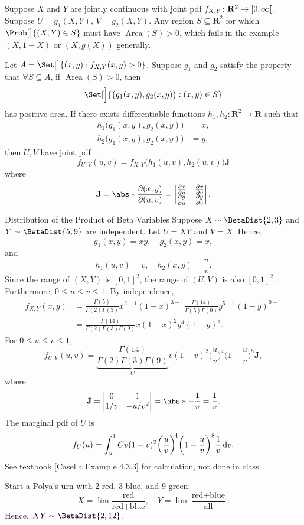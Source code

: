 Suppose $ X $ and $ Y $ are jointly continuous with joint pdf
$ f_{X,Y}\colon\mathbf{R}^2\to\interval[open right]{0}{\infty} $.
Suppose $ U=g_1(X,Y) $, $ V=g_2(X,Y) $. Any region
$ S\subseteq \mathbf{R}^2 $ for which
$ \Prob[\big]{(X,Y)\in S} $ must have $ \operatorname{Area}(S)>0 $,
which fails in the example $ (X,1-X) $ or $ (X,g(X)) $ generally.

Let $ A=\Set[\big]{(x,y)\given f_{X,Y}(x,y)>0} $.
Suppose $ g_1 $ and $ g_2 $ satisfy the property that
$ \forall S\subseteq A $, if $ \operatorname{Area}(S)>0 $, then
\[ \Set[\Big]{\bigl(g_1(x,y),g_2(x,y)\bigr)\given (x,y)\in S} \]
has positive area. If there exists differentiable functions
$ h_1,h_2\colon\mathbf{R}^2\to\mathbf{R} $ such that
\begin{align*}
    h_1\bigl(g_1(x,y),g_2(x,y)\bigr) & =x, \\
    h_2\bigl(g_1(x,y),g_2(x,y)\bigr) & =y,
\end{align*}
then $ U,V $ have joint pdf
\[ f_{U,V}(u,v)=f_{X,Y}\bigl(h_1(u,v),h_2(u,v)\bigr)\mathbf{J} \]
where
\[ \mathbf{J}=\abs*{\frac{\partial(x,y)}{\partial(u,v)}}=
    \begin{vmatrix}
        \pdv{x}{u} & \pdv{x}{v} \\
        \pdv{y}{u} & \pdv{y}{v}
    \end{vmatrix}. \]
\begin{Example}{Distribution of the Product of Beta Variables}{}
    Suppose $ X \sim \BetaDist{2,3} $ and
    $ Y \sim \BetaDist{5,9} $ are independent. Let $ U=XY $ and $ V=X $.
    Hence,
    \[ g_1(x,y)=xy,\quad g_2(x,y)=x, \]
    and
    \[ h_1(u,v)=v,\quad h_2(x,y)=\frac{u}{v}. \]
    Since the range of $ (X,Y) $ is $ [0,1]^2 $, the range of
    $ (U,V) $ is also $ [0,1]^2 $. Furthermore,
    $ 0\le u\le v\le 1 $. By independence,
    \begin{align*}
        f_{X,Y}(x,y)
         & =\frac{\Gamma(5)}{\Gamma(2)\Gamma(3)}x^{2-1}(1-x)^{3-1}
        \frac{\Gamma(14)}{\Gamma(5)\Gamma(9)}y^{5-1}(1-y)^{9-1}               \\
         & =\frac{\Gamma(14)}{\Gamma(2)\Gamma(3)\Gamma(9)}x(1-x)^2y^4(1-y)^8.
    \end{align*}
    For $ 0\le u\le v\le 1 $,
    \[
        f_{U,V}(u,v)
        =\underbrace{\frac{\Gamma(14)}{\Gamma(2)\Gamma(3)\Gamma(9)}}_{C}
        v(1-v)^2 \biggl(\frac{u}{v}\biggr)^{\!4}\biggl(1-\frac{u}{v}\biggr)^{8}\mathbf{J},
    \]
    where
    \[ \mathbf{J}=\begin{vmatrix}
            0   & 1      \\
            1/v & -u/v^2
        \end{vmatrix}=\abs*{-\frac{1}{v}}=\frac{1}{v}. \]
    The marginal pdf of $ U $ is
    \[
        f_U(u)
        =\int_{u}^{1}Cv(1-v)^2 \biggl(\frac{u}{v}\biggr)^{\!4}\biggl(1-\frac{u}{v}\biggr)^{8}\frac{1}{v}\odif{v}.\]
    See textbook [Casella Example 4.3.3] for calculation, not done in class.

    Start a Polya's urn with 2 red, 3 blue, and 9 green:
    \[ X=\lim \frac{\text{red}}{\text{red}+\text{blue}},\quad Y=\lim \frac{\text{red}+\text{blue}}{\text{all}}. \]
    Hence,
    $ XY \sim\BetaDist{2,12} $.
\end{Example}
